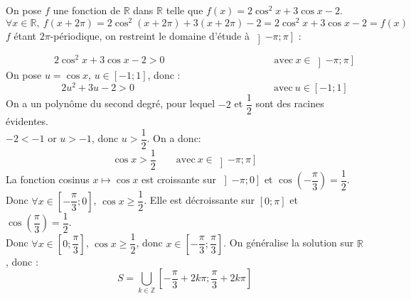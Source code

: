 \documentclass[a4paper,french,bookmarks]{article}
\begin{document}
\begin{enumerate}
\begin{enumerate}
\begin{tcolorbox}[colback=black!3,colframe=black!9,boxrule=.25pt,enhanced,arc is angular,arc=0pt]
On pose $f$ une fonction de $\mathbb{R}$ dans $\mathbb{R}$ telle que $f(x)=2\cos^2 x  + 3\cos x -2$.
\[\forall x \in \mathbb{R}, \ f(x+2\pi) = 2\cos^2\left(x+2\pi\right) + 3\left(x+2\pi\right) - 2 =2\cos^2 x  + 3\cos x -2 = f(x)\]
$f$ étant $2\pi$-périodique, on restreint le domaine d'étude à $\left]-\pi;\pi\right]$ :
    \end{tcolorbox}
    \begin{tcolorbox}[colback=black!3,colframe=black!9,boxrule=.25pt,enhanced,arc is angular,arc=0pt]
\[\qquad\qquad2\cos^2 x  + 3\cos x -2 > 0 \qquad\qquad\qquad\qquad\qquad\quad \text{avec} \ x \in \left]-\pi;\pi\right] \]
On pose $u = \cos x$, $u \in \left[-1;1\right]$, donc :
\[\qquad\qquad 2u^2  + 3u - 2 > 0 \qquad\qquad\qquad\qquad\qquad\qquad\qquad \text{avec} \ u \in \left[-1;1\right] \]
On a un polynôme du second degré, pour lequel $-2$ et $\dfrac{1}{2}$ sont des racines évidentes.\\ 
$-2 < -1$ or $u > -1$, donc $u > \dfrac{1}{2}$. On a donc:
\[\cos x > \dfrac{1}{2} \qquad \text{avec} \ x \in \left]-\pi;\pi\right]\]
La fonction cosinus $x \mapsto \cos x$ est croissante sur $\left]-\pi;0\right]$ et $\cos \left(-\dfrac{\pi}{3}\right) = \dfrac{1}{2}$.\\
Donc $\forall x \in \left[-\dfrac{\pi}{3};0\right]$, $\cos x \geq \dfrac{1}{2}$. Elle est décroissante sur $\left[0;\pi\right]$ et $\cos \left(\dfrac{\pi}{3}\right) = \dfrac{1}{2}$.\\
Donc $\forall x \in \left[0;\dfrac{\pi}{3}\right]$, $\cos x \geq \dfrac{1}{2}$, donc $x \in \left[-\dfrac{\pi}{3};\dfrac{\pi}{3}\right]$.
On généralise la solution sur $\mathbb{R}$, donc :
\[S = \bigcup\limits_{k \in \mathbb{Z}}^{}  \left[ -\dfrac{\pi}{3} + 2k\pi; \dfrac{\pi}{3} + 2k\pi\right]\]
    \end{tcolorbox}
    
    \end{enumerate}
\end{enumerate}
\end{document}
